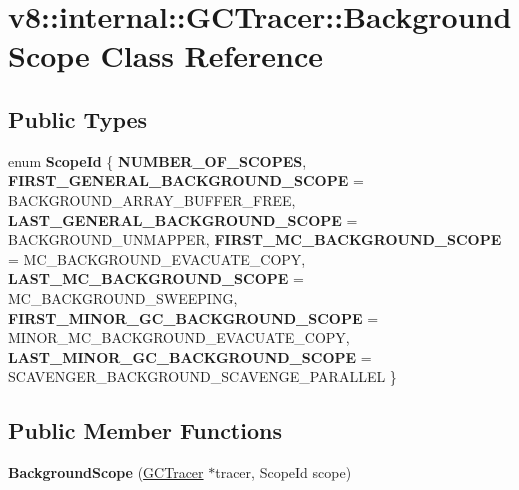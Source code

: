 \hypertarget{classv8_1_1internal_1_1GCTracer_1_1BackgroundScope}{}\section{v8\+:\+:internal\+:\+:G\+C\+Tracer\+:\+:Background\+Scope Class Reference}
\label{classv8_1_1internal_1_1GCTracer_1_1BackgroundScope}
\subsection*{Public Types}
\begin{DoxyCompactItemize}
\item 
\mbox{\label{classv8_1_1internal_1_1GCTracer_1_1BackgroundScope_a2b96e89058e09b5dd79206469ad7750a}} 
enum {\bfseries Scope\+Id} \{ \newline
{\bfseries N\+U\+M\+B\+E\+R\+\_\+\+O\+F\+\_\+\+S\+C\+O\+P\+ES}, 
{\bfseries F\+I\+R\+S\+T\+\_\+\+G\+E\+N\+E\+R\+A\+L\+\_\+\+B\+A\+C\+K\+G\+R\+O\+U\+N\+D\+\_\+\+S\+C\+O\+PE} = B\+A\+C\+K\+G\+R\+O\+U\+N\+D\+\_\+\+A\+R\+R\+A\+Y\+\_\+\+B\+U\+F\+F\+E\+R\+\_\+\+F\+R\+EE, 
{\bfseries L\+A\+S\+T\+\_\+\+G\+E\+N\+E\+R\+A\+L\+\_\+\+B\+A\+C\+K\+G\+R\+O\+U\+N\+D\+\_\+\+S\+C\+O\+PE} = B\+A\+C\+K\+G\+R\+O\+U\+N\+D\+\_\+\+U\+N\+M\+A\+P\+P\+ER, 
{\bfseries F\+I\+R\+S\+T\+\_\+\+M\+C\+\_\+\+B\+A\+C\+K\+G\+R\+O\+U\+N\+D\+\_\+\+S\+C\+O\+PE} = M\+C\+\_\+\+B\+A\+C\+K\+G\+R\+O\+U\+N\+D\+\_\+\+E\+V\+A\+C\+U\+A\+T\+E\+\_\+\+C\+O\+PY, 
\newline
{\bfseries L\+A\+S\+T\+\_\+\+M\+C\+\_\+\+B\+A\+C\+K\+G\+R\+O\+U\+N\+D\+\_\+\+S\+C\+O\+PE} = M\+C\+\_\+\+B\+A\+C\+K\+G\+R\+O\+U\+N\+D\+\_\+\+S\+W\+E\+E\+P\+I\+NG, 
{\bfseries F\+I\+R\+S\+T\+\_\+\+M\+I\+N\+O\+R\+\_\+\+G\+C\+\_\+\+B\+A\+C\+K\+G\+R\+O\+U\+N\+D\+\_\+\+S\+C\+O\+PE} = M\+I\+N\+O\+R\+\_\+\+M\+C\+\_\+\+B\+A\+C\+K\+G\+R\+O\+U\+N\+D\+\_\+\+E\+V\+A\+C\+U\+A\+T\+E\+\_\+\+C\+O\+PY, 
{\bfseries L\+A\+S\+T\+\_\+\+M\+I\+N\+O\+R\+\_\+\+G\+C\+\_\+\+B\+A\+C\+K\+G\+R\+O\+U\+N\+D\+\_\+\+S\+C\+O\+PE} = S\+C\+A\+V\+E\+N\+G\+E\+R\+\_\+\+B\+A\+C\+K\+G\+R\+O\+U\+N\+D\+\_\+\+S\+C\+A\+V\+E\+N\+G\+E\+\_\+\+P\+A\+R\+A\+L\+L\+EL
 \}
\end{DoxyCompactItemize}
\subsection*{Public Member Functions}
\begin{DoxyCompactItemize}
\item 
\mbox{\label{classv8_1_1internal_1_1GCTracer_1_1BackgroundScope_a8bf2ecff050f8be62ba004eaa3ed2065}} 
{\bfseries Background\+Scope} (\mbox{\hyperlink{classv8_1_1internal_1_1GCTracer}{G\+C\+Tracer}} $\ast$tracer, Scope\+Id scope)
\end{DoxyCompactItemize}
